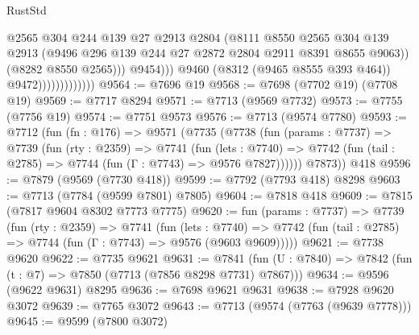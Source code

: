 \begin{lexlean}{RustStd}
\begin{coremodule}
                                        @2565
                                        @304
                                        @244
                                        @139
                                        @27
                                        @2913
                                        @2804
                                        (@8111
                                          @8550
                                          @2565
                                          @304
                                          @139
                                          @2913
                                          (@9496
                                            @296
                                            @139
                                            @244
                                            @27
                                            @2872
                                            @2804
                                            @2911
                                            @8391
                                            @8655
                                            @9063))
                                        (@8282 @8550 @2565)))
                                    @9454)))
                              @9460
                              (@8312 (@9465 @8555 @393 @464))
                              @9472)))))))))))))
@9564 := @7696 @19
@9568 := @7698 (@7702 @19) (@7708 @19)
@9569 := @7717 @8294
@9571 := @7713 (@9569 @7732)
@9573 := @7755 (@7756 @19)
@9574 := @7751 @9573
@9576 := @7713 (@9574 @7780)
@9593 := @7712
    (fun (fn : @176) =>
    @9571
      (@7735
        (@7738
          (fun (params : @7737) =>
          @7739
            (fun (rty : @2359) =>
            @7741
              (fun (lets : @7740) =>
              @7742 (fun (tail : @2785) => @7744 (fun (Γ : @7743) => @9576 @7827))))))
        @7873))
    @418
@9596 := @7879 (@9569 (@7730 @418))
@9599 := @7792 (@7793 @418) @8298
@9603 := @7713 (@7784 (@9599 @7801) @7805)
@9604 := @7818 @418
@9609 := @7815 (@7817 @9604 @8302 @7773 @7775)
@9620 := fun (params : @7737) =>
  @7739
    (fun (rty : @2359) =>
    @7741
      (fun (lets : @7740) =>
      @7742 (fun (tail : @2785) => @7744 (fun (Γ : @7743) => @9576 (@9603 @9609)))))
@9621 := @7738 @9620
@9622 := @7735 @9621
@9631 := @7841 (fun (U : @7840) => @7842 (fun (t : @7) => @7850 (@7713 (@7856 @8298 @7731) @7867)))
@9634 := @9596 (@9622 @9631) @8295
@9636 := @7698 @9621 @9631
@9638 := @7928 @9620 @3072
@9639 := @7765 @3072
@9643 := @7713 (@9574 (@7763 (@9639 @7778)))
@9645 := @9599 (@7800 @3072)

\end{coremodule}
\end{lexlean}
